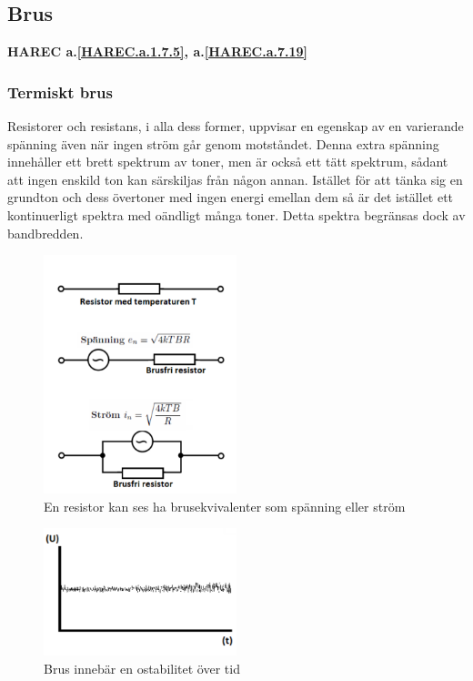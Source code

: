 \subsection{Brus}
\textbf{HAREC a.\ref{HAREC.a.1.7.5}\label{myHAREC.a.1.7.5}, a.\ref{HAREC.a.7.19}\label{myHAREC.a.7.19}}
\label{termisktbrus}

\subsubsection{Termiskt brus}

Resistorer och resistans, i alla dess former, uppvisar en egenskap av
en varierande spänning även när ingen ström går genom motståndet.
Denna extra spänning innehåller ett brett spektrum av toner, men är också ett
tätt spektrum, sådant att ingen enskild ton kan särskiljas från någon annan.
Istället för att tänka sig en grundton och dess övertoner med ingen energi
emellan dem så är det istället ett kontinuerligt spektra med oändligt många
toner.
Detta spektra begränsas dock av bandbredden.

\begin{figure}
  \includegraphics[width=0.5\textwidth]{images/cropped_pdfs/bild_2_1-36.pdf}
  \caption{En resistor kan ses ha brusekvivalenter som spänning eller ström}
  \label{fig:BildII1-36}
\end{figure}

\begin{figure}
\includegraphics[width=0.5\textwidth]{images/cropped_pdfs/bild_2_1-34.pdf}
\caption{Brus innebär en ostabilitet över tid}
\label{fig:BildII1-34}
\end{figure}

